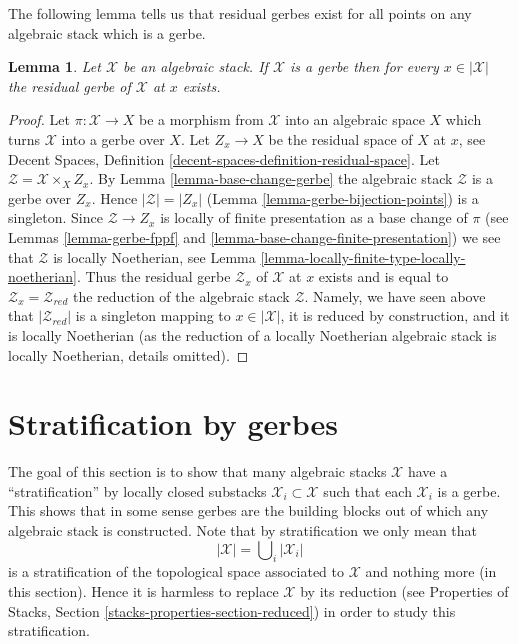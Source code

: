 \documentclass{stacks-project}
\theoremstyle{plain}
\newtheorem{lemma}[subsection]{Lemma}
\theoremstyle{definition}
\theoremstyle{remark}
\numberwithin{equation}{subsection}
\begin{document}
\noindent
The following lemma tells us that residual gerbes exist for all points
on any algebraic stack which is a gerbe.

\begin{lemma}
\label{lemma-gerbe-residual-gerbe-exists}
Let $\mathcal{X}$ be an algebraic stack. If $\mathcal{X}$ is a gerbe
then for every $x \in |\mathcal{X}|$ the residual gerbe of $\mathcal{X}$
at $x$ exists.
\end{lemma}

\begin{proof}
Let $\pi : \mathcal{X} \to X$ be a morphism from $\mathcal{X}$ into
an algebraic space $X$ which turns $\mathcal{X}$ into a gerbe over $X$.
Let $Z_x \to X$ be the residual space of $X$ at $x$, see
Decent Spaces, Definition \ref{decent-spaces-definition-residual-space}.
Let $\mathcal{Z} = \mathcal{X} \times_X Z_x$. By
Lemma \ref{lemma-base-change-gerbe}
the algebraic stack $\mathcal{Z}$ is a gerbe over $Z_x$.
Hence $|\mathcal{Z}| = |Z_x|$
(Lemma \ref{lemma-gerbe-bijection-points})
is a singleton. Since $\mathcal{Z} \to Z_x$ is locally of finite presentation
as a base change of $\pi$ (see
Lemmas \ref{lemma-gerbe-fppf} and \ref{lemma-base-change-finite-presentation})
we see that $\mathcal{Z}$ is locally Noetherian, see
Lemma \ref{lemma-locally-finite-type-locally-noetherian}.
Thus the residual gerbe $\mathcal{Z}_x$ of $\mathcal{X}$ at $x$
exists and is equal to $\mathcal{Z}_x = \mathcal{Z}_{red}$ the reduction
of the algebraic stack $\mathcal{Z}$. Namely, we have seen above
that $|\mathcal{Z}_{red}|$ is a singleton mapping to $x \in |\mathcal{X}|$,
it is reduced by construction, and it is locally Noetherian (as the
reduction of a locally Noetherian algebraic stack is locally Noetherian,
details omitted).
\end{proof}









\section{Stratification by gerbes}
\label{section-stratify}

\noindent
The goal of this section is to show that many algebraic stacks
$\mathcal{X}$ have a ``stratification'' by locally closed substacks
$\mathcal{X}_i \subset \mathcal{X}$ such that each $\mathcal{X}_i$ is
a gerbe. This shows that in some sense gerbes are the building blocks
out of which any algebraic stack is constructed. Note that by stratification
we only mean that
$$
|\mathcal{X}| = \bigcup\nolimits_i |\mathcal{X}_i|
$$
is a stratification of the topological space associated to $\mathcal{X}$
and nothing more (in this section). Hence it is harmless to replace
$\mathcal{X}$ by its reduction (see
Properties of Stacks, Section \ref{stacks-properties-section-reduced})
in order to study this stratification.
\end{document}
